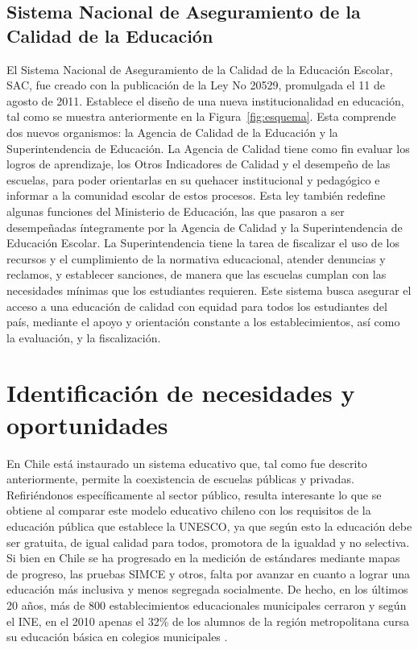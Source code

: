 \subsection{Sistema Nacional de Aseguramiento de la Calidad de la Educación}

El Sistema Nacional de Aseguramiento de la Calidad de la Educación Escolar, SAC, fue creado con la publicación de la Ley No 20529, promulgada el 11 de agosto de 2011. Establece el diseño de una nueva institucionalidad en educación, tal como se muestra anteriormente en la Figura~\ref{fig:esquema}. Esta comprende dos nuevos organismos: la Agencia de Calidad de la Educación y la Superintendencia de Educación.
La Agencia de Calidad tiene como fin evaluar los logros de aprendizaje, los Otros Indicadores de Calidad y el desempeño de las escuelas, para poder orientarlas en su quehacer institucional y pedagógico e informar a la comunidad escolar de estos procesos.
Esta ley también redefine algunas funciones del Ministerio de Educación, las que pasaron a ser desempeñadas íntegramente por la Agencia de Calidad y la Superintendencia de Educación Escolar.
La Superintendencia tiene la tarea de fiscalizar el uso de los recursos y el cumplimiento de la normativa educacional, atender denuncias y reclamos, y establecer sanciones, de manera que las escuelas cumplan con las necesidades mínimas que los estudiantes requieren.
Este sistema busca asegurar el acceso a una educación de calidad con equidad para todos los estudiantes del país, mediante el apoyo y orientación constante a los establecimientos, así como la evaluación, y la fiscalización. \cite{sac}

\section{Identificación de necesidades y oportunidades}
En Chile está instaurado un sistema educativo que, tal como fue descrito anteriormente, permite la coexistencia de escuelas públicas y privadas. Refiriéndonos específicamente al sector público, resulta interesante lo que se obtiene al comparar este modelo educativo chileno con los requisitos de la educación pública que establece la UNESCO, ya que según esto la educación debe ser gratuita, de igual calidad para todos, promotora de la igualdad y no selectiva. Si bien en Chile se ha progresado en la medición de estándares mediante mapas de progreso, las pruebas SIMCE y otros, falta por avanzar en cuanto a lograr una educación más inclusiva y menos segregada socialmente. De hecho, en los últimos 20 años, más de 800 establecimientos educacionales municipales cerraron \cite{biobio} y según el INE, en el 2010 apenas el 32\% de los alumnos de la región metropolitana cursa su educación básica en colegios municipales \cite{ine}. 

